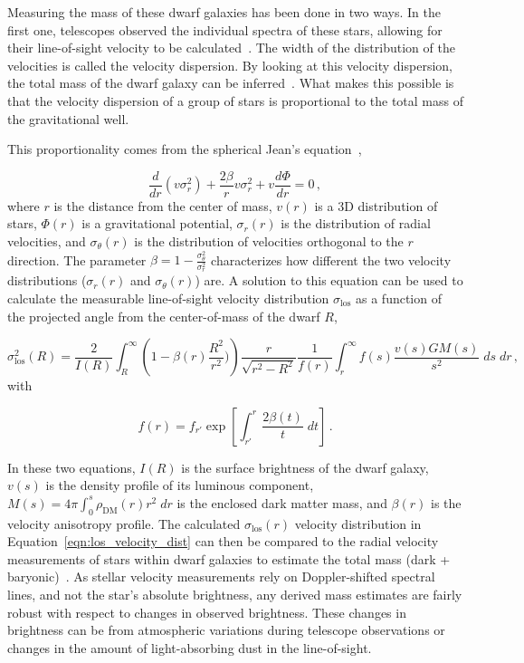 Measuring the mass of these dwarf galaxies has been done in two ways.
In the first one, telescopes observed the individual spectra of these stars, allowing for their line-of-sight velocity to be calculated~\cite{dwarf_gal_red_giant}.
The width of the distribution of the velocities is called the velocity dispersion.
By looking at this velocity dispersion, the total mass of the dwarf galaxy can be inferred~\cite{dwarf_gal_vel_dispersion, dwarf_gal_vel_dispersion2}.
What makes this possible is that the velocity dispersion of a group of stars is proportional to the total mass of the gravitational well.

This proportionality comes from the spherical Jean's equation~\cite{galactic_dynamics},

\begin{equation}\label{eqn:jeans}
  \frac{d}{dr} \left ( v \sigma_r^2\right) + \frac{2 \beta}{r}v \sigma_r^2 + v \frac{d \Phi}{dr}=0 \,,
\end{equation}
where $r$ is the distance from the center of mass, $v(r)$ is a 3D distribution of stars, $\Phi(r)$ is a gravitational potential, $\sigma_r(r)$ is the distribution of radial velocities, and $\sigma_\theta(r)$ is the distribution of velocities orthogonal to the $r$ direction.
The parameter $\beta = 1 - \frac{\sigma_{\theta}^2}{\sigma_r^2}$ characterizes how different the two velocity distributions ($\sigma_r(r)$ and $\sigma_{\theta}(r)$) are.
A solution to this equation can be used to calculate the measurable line-of-sight velocity distribution $\sigma_{\mathrm{los}}$ as a function of the projected angle from the center-of-mass of the dwarf $R$, 

\begin{equation}\label{eqn:los_velocity_dist}
  \sigma_{\mathrm{los}}^2 \left ( R \right ) = \frac{2}{I(R)} \int_R^{\infty} \left ( 1 - \beta(r) \frac{R^2}{r^2}) \right ) \frac{r}{\sqrt{r^2-R^2}} \frac{1}{f(r)} \int_r^\infty f(s) \frac{v(s)GM(s)}{s^2} \; ds\; dr \,,
\end{equation}
with

\begin{equation}\label{eqn:los_velocity_dist2}
  f(r) = f_{r'} \exp \left [ \int_{r'}^r \frac{2 \beta(t) }{t} \; dt \right ] \, .
\end{equation}

In these two equations, $I(R)$ is the surface brightness of the dwarf galaxy, $v(s)$ is the density profile of its luminous component, $M(s)=4\pi \int_0^s \rho_{\textrm{DM}}(r) r^2 \; dr$ is the enclosed dark matter mass, and $\beta(r)$ is the velocity anisotropy profile.
The calculated $\sigma_{\mathrm{los}}(r)$ velocity distribution in Equation~\ref{eqn:los_velocity_dist} can then be compared to the radial velocity measurements of stars within dwarf galaxies to estimate the total mass (dark + baryonic)~\cite{dwarf_gal_vel_dispersion,dwarf_gal_vel_dispersion_a,dwarf_jfactors_no_priors}.
As stellar velocity measurements rely on Doppler-shifted spectral lines, and not the star's absolute brightness, any derived mass estimates are fairly robust with respect to changes in observed brightness.
These changes in brightness can be from atmospheric variations during telescope observations or changes in the amount of light-absorbing dust in the line-of-sight.

